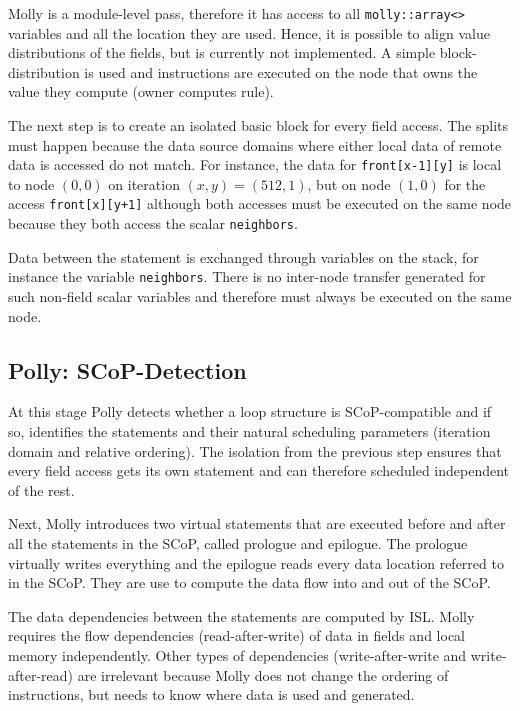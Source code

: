 \documentclass{sigplanconf}
\begin{document}
Molly is a module-level pass, therefore it has access to all \texttt{molly::array<>} variables and all the location they are used. Hence, it is possible to align value distributions of the fields, but is currently not implemented. A simple block-distribution is used and instructions are executed on the node that owns the value they compute (owner computes rule).

The next step is to create an isolated basic block for every field access. The splits must happen because the data source domains where either local data of remote data is accessed do not match. For instance, the data for \texttt{front[x-1][y]} is local to node $(0,0)$ on iteration $(x,y)=(512,1)$, but on node $(1,0)$ for the access \texttt{front[x][y+1]} although both accesses must be executed on the same node because they both access the scalar \texttt{neighbors}. 

Data between the statement is exchanged through variables on the stack, for instance the variable \texttt{neighbors}. There is no inter-node transfer generated for such non-field scalar variables and therefore must always be executed on the same node.



\subsection{Polly: SCoP-Detection}

At this stage Polly detects whether a loop structure is SCoP-compatible and if so, identifies the statements and their natural scheduling parameters (iteration domain and relative ordering). The isolation from the previous step ensures that every field access gets its own statement and can therefore scheduled independent of the rest.

Next, Molly introduces two virtual statements that are executed before and after all the statements in the SCoP, called prologue and epilogue. The prologue virtually writes everything and the epilogue reads every data location referred to in the SCoP. They are use to compute the data flow into and out of the SCoP.

The data dependencies between the statements are computed by ISL. Molly requires the flow dependencies (read-after-write) of data in fields and local memory independently. Other types of dependencies (write-after-write and write-after-read) are irrelevant because Molly does not change the ordering of instructions, but needs to know where data is used and generated.
\end{document}
